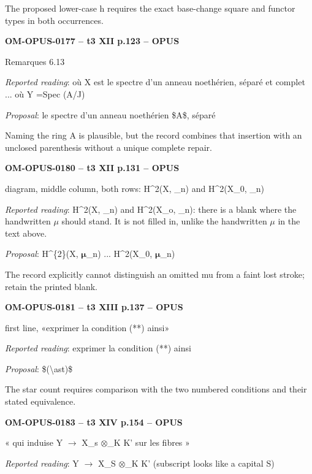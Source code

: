 The proposed lower-case h requires the exact base-change square and functor types in both occurrences.\par
\par\noindent\textbf{OM-OPUS-0177 -- t3 XII p.123 -- OPUS}\par
Remarques 6.13\par
\emph{Reported reading}: où X est le spectre d'un anneau noethérien, séparé et complet ... où Y =\allowbreak  Spec (A/J)\par
\emph{Proposal}: le spectre d'un anneau noethérien \$A\$, séparé\par
Naming the ring A is plausible, but the record combines that insertion with an unclosed parenthesis without a unique complete repair.\par
\par\noindent\textbf{OM-OPUS-0180 -- t3 XII p.131 -- OPUS}\par
diagram, middle column, both rows: H\textasciicircum{}2(X, \_n) and H\textasciicircum{}2(X\_0, \_n)\par
\emph{Reported reading}: H\textasciicircum{}2(X, \_n) and H\textasciicircum{}2(X\_o, \_n): there is a blank where the handwritten \ensuremath{\mu} should stand. It is not filled in, unlike the handwritten \ensuremath{\mu} in the text above.\par
\emph{Proposal}: H\textasciicircum{}\{2\}(X, \ensuremath{𝛍}\_n) ... H\textasciicircum{}2(X\_0, \ensuremath{𝛍}\_n)\par
The record explicitly cannot distinguish an omitted mu from a faint lost stroke; retain the printed blank.\par
\par\noindent\textbf{OM-OPUS-0181 -- t3 XIII p.137 -- OPUS}\par
first line, «exprimer la condition (**) ainsi»\par
\emph{Reported reading}: exprimer la condition (**) ainsi\par
\emph{Proposal}: \$(\textbackslash{}ast)\$\par
The star count requires comparison with the two numbered conditions and their stated equivalence.\par
\par\noindent\textbf{OM-OPUS-0183 -- t3 XIV p.154 -- OPUS}\par
« qui induise Y \ensuremath{\to} X\_s \ensuremath{\otimes}\_K K' sur les fibres »\par
\emph{Reported reading}: Y \ensuremath{\longrightarrow} X\_S \ensuremath{\otimes}\_K K' (subscript looks like a capital S)\par
